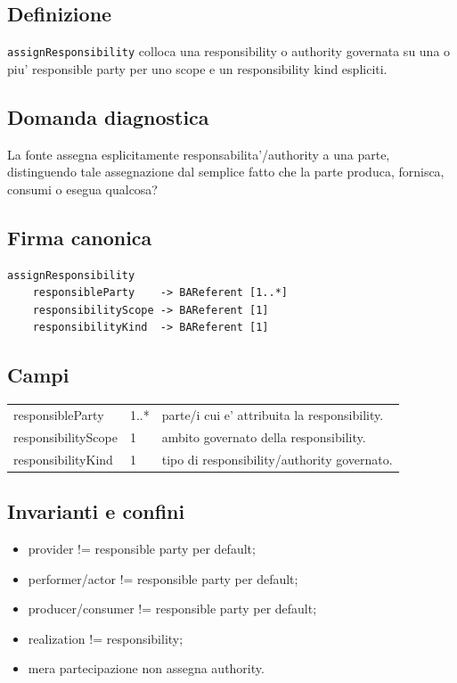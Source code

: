 \documentclass[11pt,a4paper]{article}
\begin{document}
\subsection{Definizione}
\texttt{assignResponsibility} colloca una responsibility o authority governata su una o piu' responsible party per uno scope e un responsibility kind espliciti.

\subsection{Domanda diagnostica}
La fonte assegna esplicitamente responsabilita'/authority a una parte, distinguendo tale assegnazione dal semplice fatto che la parte produca, fornisca, consumi o esegua qualcosa?

\subsection{Firma canonica}
\begin{lstlisting}
assignResponsibility
    responsibleParty    -> BAReferent [1..*]
    responsibilityScope -> BAReferent [1]
    responsibilityKind  -> BAReferent [1]
\end{lstlisting}

\subsection{Campi}
\begin{tabularx}{\textwidth}{L{45mm}L{24mm}Y}
\toprule
responsibleParty & 1..* & parte/i cui e' attribuita la responsibility. \\
responsibilityScope & 1 & ambito governato della responsibility. \\
responsibilityKind & 1 & tipo di responsibility/authority governato. \\
\bottomrule
\end{tabularx}

\subsection{Invarianti e confini}
\begin{itemize}
  \item provider != responsible party per default;
  \item performer/actor != responsible party per default;
  \item producer/consumer != responsible party per default;
  \item realization != responsibility;
  \item mera partecipazione non assegna authority.
\end{itemize}
\end{document}
